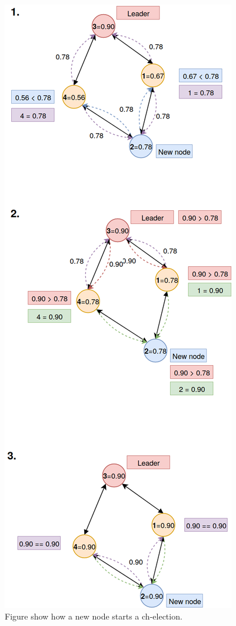 \documentclass[USenglish]{uit-thesis}
\begin{document}
\begin{figure}
\centering
\includegraphics[scale=0.3]{newNodeLeaderElection.png}
\caption{Figure show how a new node starts a \gls{ch}-election.}
\label{fig:newNodeLeaderElection}
\end{figure}
\end{document}
